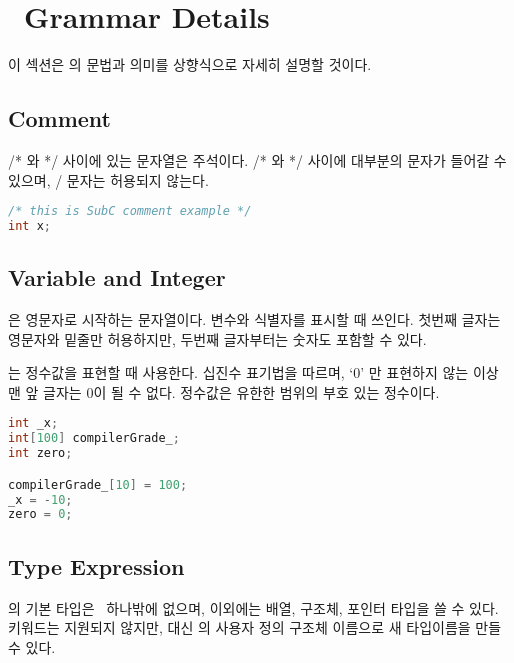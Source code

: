 \section{\SubC \ Grammar Details}

이 섹션은 \SubC 의 문법과 의미를 상향식으로 자세히 설명할 것이다.


\subsection{Comment}

/* 와 */ 사이에 있는 문자열은 주석이다. /* 와 */ 사이에 대부분의 문자가 들어갈 수 있으며, / 문자는 허용되지 않는다.

\begin{lstlisting}[language=C, caption=Comment]
/* this is SubC comment example */
int x;
\end{lstlisting}




\subsection{Variable and Integer}

\Variable 은 영문자로 시작하는 문자열이다. 변수와 식별자를 표시할 때 쓰인다.
첫번째 글자는 영문자와 밑줄만 허용하지만, 두번째 글자부터는 숫자도 포함할 수 있다.

\medskip

\Integer 는 정수값을 표현할 때 사용한다. 십진수 표기법을 따르며, `0' 만 표현하지 않는 이상 맨 앞 글자는 0이 될 수 없다.
 정수값은 유한한 범위의 부호 있는 정수이다.

\begin{lstlisting}[language=C, caption=Variable and integer]
int _x;
int[100] compilerGrade_;
int zero;

compilerGrade_[10] = 100;
_x = -10;
zero = 0;
\end{lstlisting}
  



\subsection{Type Expression}

\SubC 의 기본 타입은 \CCint \ 하나밖에 없으며, 이외에는 배열, 구조체, 포인터 타입을 쓸 수 있다.
 키워드는 지원되지 않지만, 대신  의 사용자 정의 구조체 이름으로 새 타입이름을 만들 수 있다.

